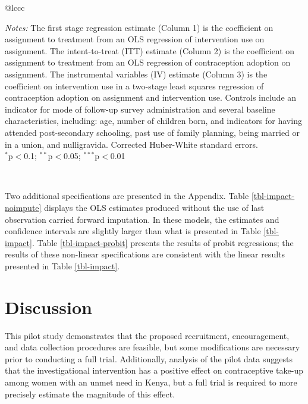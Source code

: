 \documentclass[man]{apa6}
\theoremstyle{definition}
\theoremstyle{definition}
\theoremstyle{definition}
\theoremstyle{remark}
\begin{document}
\begin{table}[!htbp]
\begin{tabular}{@{\extracolsep{5pt}}lccc}
 {\parbox[t]{17cm}{ \textit{Notes:} The first stage regression estimate (Column 1) is the coefficient on assignment to treatment from an OLS regression of intervention use on assignment. The intent-to-treat (ITT) estimate (Column 2) is the coefficient on assignment to treatment from an OLS regression of contraception adoption on assignment. The instrumental variables (IV) estimate (Column 3) is the coefficient on intervention use in a two-stage least squares regression of contraception adoption on assignment and intervention use. Controls include an indicator for mode of follow-up survey administration and several baseline characteristics, including: age, number of children born, and indicators for having attended post-secondary schooling, past use of family planning, being married or in a union, and nulligravida. Corrected Huber-White standard errors. \\ $^{*}$p$<$0.1; $^{**}$p$<$0.05; $^{***}$p$<$0.01}} \\
\end{tabular} 
\end{table}

Two additional specifications are presented in the Appendix. Table
\ref{tbl-impact-noimpute} displays the OLS estimates produced without
the use of last observation carried forward imputation. In these models,
the estimates and confidence intervals are slightly larger than what is
presented in Table \ref{tbl-impact}. Table \ref{tbl-impact-probit}
presents the results of probit regressions; the results of these
non-linear specifications are consistent with the linear results
presented in Table \ref{tbl-impact}.

\hypertarget{discussion}{%
\section{Discussion}\label{discussion}}

This pilot study demonstrates that the proposed recruitment,
encouragement, and data collection procedures are feasible, but some
modifications are necessary prior to conducting a full trial.
Additionally, analysis of the pilot data suggests that the
investigational intervention has a positive effect on contraceptive
take-up among women with an unmet need in Kenya, but a full trial is
required to more precisely estimate the magnitude of this effect.
\end{document}
